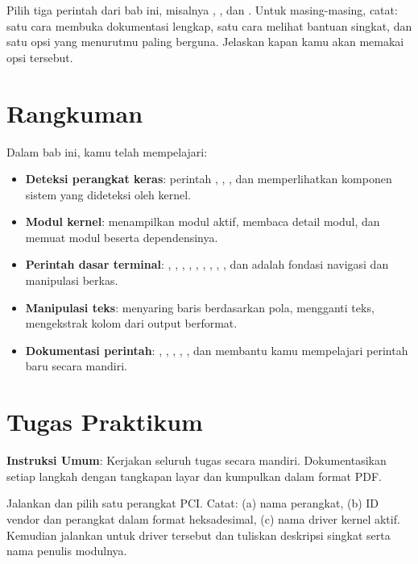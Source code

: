 \begin{challengebox}
Pilih tiga perintah dari bab ini, misalnya , , dan . Untuk masing-masing, catat: satu cara membuka dokumentasi lengkap, satu cara melihat bantuan singkat, dan satu opsi yang menurutmu paling berguna. Jelaskan kapan kamu akan memakai opsi tersebut.
\end{challengebox}

\section{Rangkuman}

Dalam bab ini, kamu telah mempelajari:

\begin{itemize}[noitemsep,topsep=2pt]
    \item \textbf{Deteksi perangkat keras}: perintah , , , dan  memperlihatkan komponen sistem yang dideteksi oleh kernel.
    \item \textbf{Modul kernel}:  menampilkan modul aktif,  membaca detail modul, dan  memuat modul beserta dependensinya.
    \item \textbf{Perintah dasar terminal}: , , , , , , , , , dan  adalah fondasi navigasi dan manipulasi berkas.
    \item \textbf{Manipulasi teks}:  menyaring baris berdasarkan pola,  mengganti teks,  mengekstrak kolom dari output berformat.
    \item \textbf{Dokumentasi perintah}: , , , , , dan  membantu kamu mempelajari perintah baru secara mandiri.
\end{itemize}

\section{Tugas Praktikum}

\textbf{Instruksi Umum}: Kerjakan seluruh tugas secara mandiri. Dokumentasikan setiap langkah dengan tangkapan layar dan kumpulkan dalam format PDF.

\begin{exercisebox}
Jalankan  dan pilih satu perangkat PCI. Catat: (a) nama perangkat, (b) ID vendor dan perangkat dalam format heksadesimal, (c) nama driver kernel aktif. Kemudian jalankan  untuk driver tersebut dan tuliskan deskripsi singkat serta nama penulis modulnya.
\end{exercisebox}

